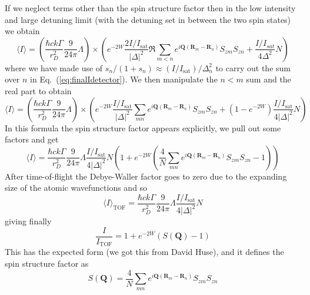 \documentclass[11pt,letter]{article}
\newcommand{\bv}[1]{\ensuremath{\bm{#1}}}
\begin{document}
If we neglect terms other than the spin structure factor then  in the low intensity and large detuning limit (with the detuning set in between the two spin states) we obtain 
\begin{equation}
\langle I \rangle =
 \left( 
 \frac{\hbar c k \Gamma}{r_{D}^{2}}  
     \frac{9}{24\pi} \Lambda 
  \right) \times 
  \left(
    e^{-2W} \frac{2I/I_{\mathrm{sat}}}{ |\Delta|^{2} }  \Re \sum_{m<n}  
      e^{ i \bv{Q}( \bv{R}_{m} - \bv{R}_{n} ) } 
      S_{zm}S_{zn}  
  +  \frac{I/I_{sat}}{ 4 \Delta^{2} } N
  \right)
\end{equation}
where we have made use of $s_{n}/(1+s_{n}) \approx (I/I_{\mathrm{sat}})/ \Delta_{n}^{2}$ to carry out the sum over $n$ in Eq.~(\ref{eq:finalIdetector}).  We then manipulate the $n<m$ sum and the real part to obtain
\begin{equation}
\langle I \rangle =
 \left( 
 \frac{\hbar c k \Gamma}{r_{D}^{2}}  
     \frac{9}{24\pi} \Lambda 
  \right) \times 
  \left(
    e^{-2W} \frac{I/I_{\mathrm{sat}}}{ |\Delta|^{2} }  \sum_{m n}  
      e^{ i \bv{Q}( \bv{R}_{m} - \bv{R}_{n} ) } 
      S_{zm}S_{zn}  
  + (1- e^{-2W}) \frac{I/I_{\mathrm{sat}}}{ 4|\Delta|^{2} }  N
  \right)
\end{equation}
In this formula the spin structure factor appears explicitly, we pull out some factors and get  
\begin{equation}
\langle I \rangle =
 \frac{\hbar c k \Gamma}{r_{D}^{2}}  
     \frac{9}{24\pi} \Lambda
 \frac{I/I_{\mathrm{sat}}}{ 4|\Delta|^{2} }  N
  \left(
   1 + 
    e^{-2W} \left( \frac{4}{ N }  \sum_{m n}  
      e^{ i \bv{Q}( \bv{R}_{m} - \bv{R}_{n} ) } 
      S_{zm}S_{zn}  - 1 \right )
     \right)
\end{equation}
After time-of-flight the Debye-Waller factor goes to zero due to the expanding size of the atomic wavefunctions and so  
\begin{equation}
\langle I \rangle_{\mathrm{TOF}} =
 \frac{\hbar c k \Gamma}{r_{D}^{2}}  
     \frac{9}{24\pi} \Lambda
 \frac{I/I_{\mathrm{sat}}}{ 4|\Delta|^{2} }  N
\end{equation}
giving finally 
\begin{equation}
 \frac{I}{I_{\mathrm{TOF}}} = 1 +  e^{-2W}( S(\bv{Q}) - 1 ) 
\end{equation}
This has the expected form (we got this from David Huse), and it defines the spin structure factor as 
\begin{equation}
    S(\bv{Q}) =  \frac{4}{ N }  \sum_{m n}  
      e^{ i \bv{Q}( \bv{R}_{m} - \bv{R}_{n} ) } 
      S_{zm}S_{zn}  
\end{equation}
\end{document}
